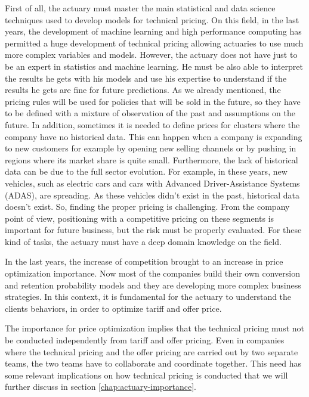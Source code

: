 \documentclass[a4paper, twoside, openright, 12pt]{report}
\theoremstyle{definition}
\theoremstyle{definition}
\theoremstyle{definition}
\theoremstyle{remark}
\begin{document}
First of all, the actuary must master the main statistical and data science techniques used to develop models for technical pricing. On this field, in the last years, the development of machine learning and high performance computing has permitted a huge development of technical pricing allowing actuaries to use much more complex variables and models. However, the actuary does not have just to be an expert in statistics and machine learning. He must be also able to interpret the results he gets with his models and use his expertise to understand if the results he gets are fine for future predictions. As we already mentioned, the pricing rules will be used for policies that will be sold in the future, so they have to be defined with a mixture of observation of the past and assumptions on the future. In addition, sometimes it is needed to define prices for clusters where the company have no historical data. This can happen when a company is expanding to new customers for example by opening new selling channels or by pushing in regions where its market share is quite small. Furthermore, the lack of historical data can be due to the full sector evolution. For example, in these years, new vehicles, such as electric cars and cars with Advanced Driver-Assistance Systems (ADAS), are spreading. As these vehicles didn't exist in the past, historical data doesn't exist. So, finding the proper pricing is challenging. From the company point of view, positioning with a competitive pricing on these segments is important for future business, but the risk must be properly evaluated. For these kind of tasks, the actuary must have a deep domain knowledge on the field.

In the last years, the increase of competition brought to an increase in price optimization importance. Now most of the companies build their own conversion and retention probability models and they are developing more complex business strategies. In this context, it is fundamental for the actuary to understand the clients behaviors, in order to optimize tariff and offer price.

The importance for price optimization implies that the technical pricing must not be conducted independently from tariff and offer pricing. Even in companies where the technical pricing and the offer pricing are carried out by two separate teams, the two teams have to collaborate and coordinate together. This need has some relevant implications on how technical pricing is conducted that we will further discuss in section \ref{chap:actuary-importance}.
\end{document}
